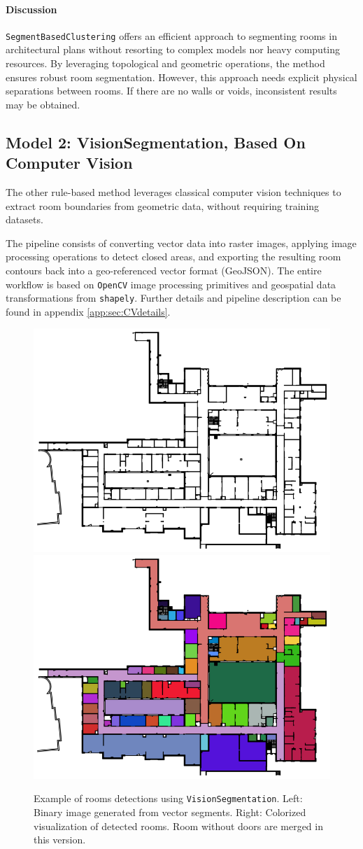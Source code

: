 \documentclass[11pt]{article}
\begin{document}
\paragraph{Discussion} \texttt{SegmentBasedClustering} offers an efficient approach to segmenting 
rooms in architectural plans without resorting to complex models nor heavy 
computing resources. By leveraging 
topological and geometric operations, the method ensures robust room segmentation.
However, this approach needs explicit physical separations between rooms. 
If there are no walls or voids, inconsistent results may be obtained.


\subsection{Model 2: VisionSegmentation, Based On Computer Vision}

The other rule-based method leverages classical computer 
vision techniques to extract room boundaries from 
geometric data, without requiring training datasets.

The pipeline consists of converting vector data into raster images, applying 
image processing operations to detect closed areas, and exporting the resulting 
room contours back into a geo-referenced vector format (GeoJSON). The entire 
workflow is based on \texttt{OpenCV} image processing primitives and geospatial data 
transformations from \texttt{shapely}. Further details and pipeline description 
can be found in appendix \ref{app:sec:CVdetails}. 

\begin{figure}[htp!]
    \centering
    \includegraphics[width=0.48\linewidth]{figures/01.binary_image.png}
    \hfill
    \includegraphics[width=0.48\linewidth]{figures/02.contours_image.png}
    \caption{Example of rooms detections using \texttt{VisionSegmentation}. 
    Left: Binary image generated from vector segments. 
    Right: Colorized visualization of detected rooms. Room without doors are merged in this version.}
    \label{fig:geojson_and_colored}
\end{figure}
\end{document}
